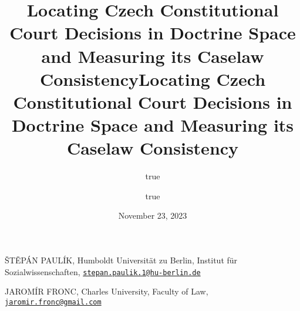 \documentclass[
  11pt,
]{article}
\title{Locating Czech Constitutional Court Decisions in Doctrine Space
and Measuring its Caselaw Consistency}
\author{true \and true}
\date{November 23, 2023}
\title{Locating Czech Constitutional Court Decisions in Doctrine Space
and Measuring its Caselaw Consistency }
\date{}
\begin{document}



{%
\setlength{\parindent}{0pt}
\thispagestyle{plain}
{%
\maketitle  %

}




{
   \vskip 13.5pt\relax \normalsize\fontsize{11}{12}
   \MakeUppercase{Štěpán Paulík}, \small{Humboldt Universität zu Berlin,
Institut für Sozialwissenschaften,
\href{mailto:stepan.paulik.1@hu-berlin.de}{\nolinkurl{stepan.paulik.1@hu-berlin.de}}}   \par \vskip -3.5pt \MakeUppercase{Jaromír
Fronc}, \small{Charles University, Faculty of Law,
\href{mailto:jaromir.fronc@gmail.com}{\nolinkurl{jaromir.fronc@gmail.com}}}   

}

}
\end{document}
